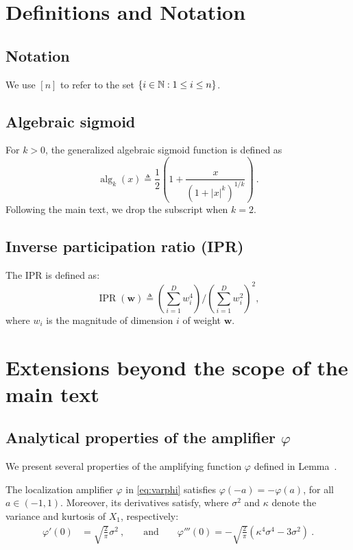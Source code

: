 \section{Definitions and Notation}

\subsection{Notation}
We use $[n]$ to refer to the set $\{ i \in \operatorname{\mathbb{N}} : 1 \leq i \leq n \}$.

\subsection{Algebraic sigmoid}
\label{sec:algebraic-sigmoid}
For $k > 0$, the generalized algebraic sigmoid function is defined as
\begin{equation}
    \operatorname{alg}_k(x) \triangleq \frac{1}{2} \left( 1  + \frac{x}{(1+|x|^k)^{1/k}} \right)~.
\end{equation}
Following the main text, we drop the subscript when $k = 2$.

\subsection{Inverse participation ratio (IPR)}
\label{app:IPR}
The IPR is defined as:
$$ \operatorname{IPR}(\mathbf{w}) \triangleq \left(\sum_{i=1}^D w_i^4\right)/\left(\sum_{i=1}^D w_i^2\right)^2, $$
where $w_i$ is the magnitude of dimension $i$ of weight $\mathbf{w}$.

\section{Extensions beyond the scope of the main text}

\subsection{Analytical properties of the amplifier $\varphi$}
\label{sec:varphi-analysis}

We present several properties of the amplifying function $\varphi$
defined in Lemma~.

\begin{lemma} \label{lem:varphi}
    The localization amplifier $\varphi$ in \cref{eq:varphi} satisfies $\varphi(-a) = -\varphi(a)$, for all $a \in (-1,1)$.
    Moreover, its derivatives satisfy, where $\sigma^2$ and $\kappa$ denote the variance and kurtosis of $X_1$, respectively:
    \vspace{-10pt}
    \begin{align*}
      \varphi'(0) &= \sqrt{\frac{2}{\pi}} \sigma^2~, &&\text { and }&&
      \varphi'''(0) = -\sqrt{\frac{2}{\pi}} (\kappa^4 \sigma^4 - 3 \sigma^2)~.
    \end{align*}
    \end{lemma}
\vspace{-6pt}

